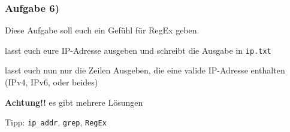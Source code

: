 \documentclass[12pt,utf8, handout]{beamer}
\begin{document}
\begin{frame}
\frametitle{Aufgabe 6)}
Diese Aufgabe soll euch ein Gefühl für RegEx geben.
\begin{itemize}
{\footnotesize
	\item lasst euch eure IP-Adresse ausgeben und schreibt die Ausgabe in \texttt{ip.txt}
	\item lasst euch nun nur die Zeilen Ausgeben, die eine valide IP-Adresse enthalten (IPv4, IPv6, oder beides)
	\item \textbf{Achtung!!} es gibt mehrere Lösungen
	}
\end{itemize}
{\scriptsize Tipp: \texttt{ip addr}, \texttt{grep}, \texttt{RegEx}}
\end{frame}
\end{document}
